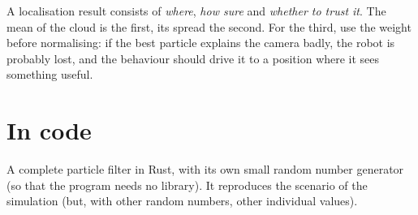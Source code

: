 \begin{keyidea}
A localisation result consists of \emph{where}, \emph{how sure} and \emph{whether to trust it}. The mean of the cloud is the first, its spread the second. For the third, use the weight before normalising: if the best particle explains the camera badly, the robot is probably lost, and the behaviour should drive it to a position where it sees something useful.
\end{keyidea}

\section*{In code}
A complete particle filter in Rust, with its own small random number generator (so that the program needs no library). It reproduces the scenario of the simulation (but, with other random numbers, other individual values).
